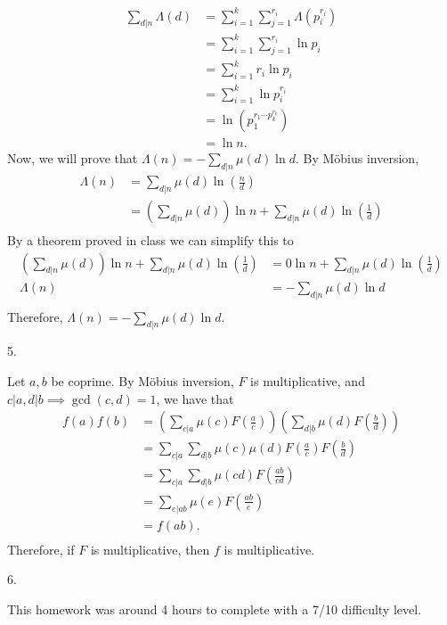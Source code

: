 \documentclass[11pt]{article}
\begin{document}
\begin{align*}
    \sum_{d\vert n}\Lambda(d)&=\sum_{i=1}^k\sum_{j=1}^{r_i}\Lambda(p_i^{r_i}) \\
    &=\sum_{i=1}^k\sum_{j=1}^{r_i} \ln p_i \\
    &=\sum_{i=1}^k r_i\ln p_i \\
    &=\sum_{i=1}^k \ln p_i^{r_i} \\
    &=\ln(p_1^{r_1\cdots p_k^{r_k}}) \\
    &=\ln n.
\end{align*}
Now, we will prove that $\Lambda(n)=-\sum_{d\vert n}\mu(d)\ln d$. By M\"obius inversion,
\begin{align*}
    \Lambda(n)&=\sum_{d\vert n}\mu(d)\ln\left(\frac{n}{d}\right) \\
    &=\left(\sum_{d\vert n}\mu(d)\right)\ln n+\sum_{d\vert n}\mu(d)\ln\left(\frac{1}{d}\right) \\
\end{align*}
By a theorem proved in class we can simplify this to 
\begin{align*}
    \left(\sum_{d\vert n}\mu(d)\right)\ln n+\sum_{d\vert n}\mu(d)\ln\left(\frac{1}{d}\right)&=
    0\ln n+\sum_{d\vert n}\mu(d)\ln\left(\frac{1}{d}\right) \\
    \Lambda(n)&=-\sum_{d\vert n}\mu(d)\ln d \\
\end{align*}
Therefore, $\Lambda(n)=-\sum_{d\vert n}\mu(d)\ln d$.

\begin{flushleft}
5.
\end{flushleft}
Let $a,b$ be coprime. By M\"obius inversion, $F$ is multiplicative, and $c\vert a,d\vert b\implies \gcd(c, d)=1$, we have that
\begin{align*}
    f(a)f(b)&=\left(\sum_{c\vert a}\mu(c)F(\frac{a}{c})\right)\left(\sum_{d\vert b}\mu(d)F(\frac{b}{d})\right)\\
    &=\sum_{c\vert a}\sum_{d\vert b}\mu(c)\mu(d)F(\frac{a}{c})F(\frac{b}{d})\\
    &=\sum_{c\vert a}\sum_{d\vert b}\mu(cd)F(\frac{ab}{cd})\\
    &=\sum_{e\vert ab}\mu(e)F(\frac{ab}{e})\\
    &=f(ab).\\
\end{align*}
Therefore, if $F$ is multiplicative, then $f$ is multiplicative.

\begin{flushleft}
6.
\end{flushleft}
This homework was around 4 hours to complete with a 7/10 difficulty level.
\end{document}
